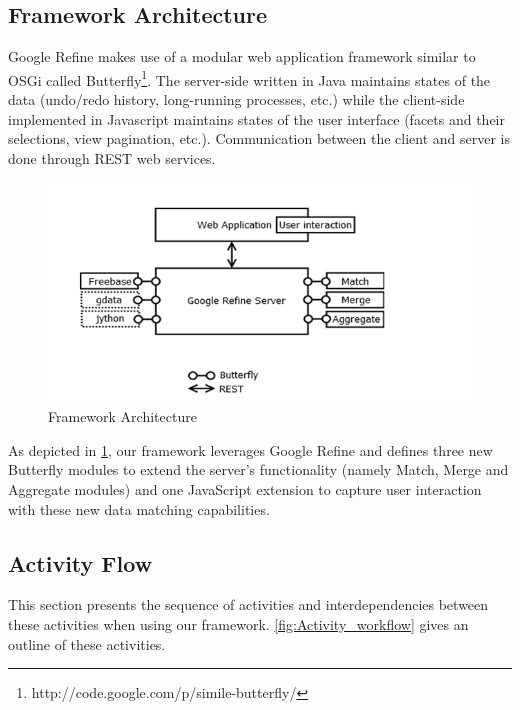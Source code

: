 \documentclass{../../Util/LaTEX/sig-alternate}
\begin{document}

\subsection{Framework Architecture}
Google Refine makes use of a modular web application framework similar to OSGi called Butterfly\footnote{http://code.google.com/p/simile-butterfly/}. The server-side written in Java maintains states of the data (undo/redo history, long-running processes, etc.) while the client-side implemented in Javascript maintains states of the user interface (facets and their selections, view pagination, etc.). Communication between the client and server is done through REST web services.

\begin{figure}[ht!]
  \centering
    \includegraphics[scale=0.6]{architecture-1.png}
  \caption{Framework Architecture}
  \label{fig:framework_architecture}
\end{figure}

As depicted in \ref{fig:framework_architecture}, our framework leverages Google Refine and defines three new Butterfly modules to extend the server's functionality (namely Match, Merge and Aggregate modules) and one JavaScript extension to capture user interaction with these new data matching capabilities.

\subsection{Activity Flow}
This section presents the sequence of activities and interdependencies between these activities when using our framework. \ref{fig:Activity_workflow} gives an outline of these activities.
\end{document}
